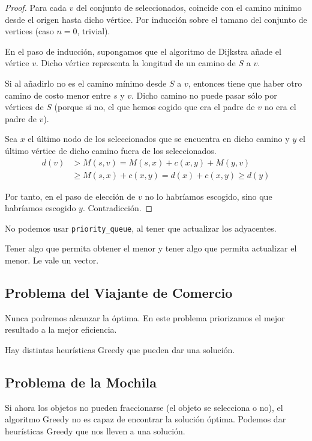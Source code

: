\begin{proof}
    Para cada $v$ del conjunto de seleccionados, coincide con el camino minimo desde el origen hasta dicho vértice. Por inducción sobre el tamano del conjunto de vertices (caso $n=0$, trivial).

    En el paso de inducción, supongamos que el algoritmo de Dijkstra añade el vértice $v$. Dicho vértice representa la longitud de un camino de $S$ a $v$.

    Si al añadirlo no es el camino mínimo desde $S$ a $v$, entonces tiene que haber otro camino de costo menor entre $s$ y $v$. Dicho camino no puede pasar sólo por vértices de $S$ (porque si no, el que hemos cogido que era el padre de $v$ no era el padre de $v$).

    Sea $x$ el último nodo de los seleccionados que se encuentra en dicho camino y $y$ el último vértice de dicho camino fuera de los seleccionados.
    \begin{align*}
        d(v) &> M(s,v) = M(s,x) + c(x,y) + M(y, v)\\
             &\geq M(s,x) + c(x,y) = d(x) + c(x,y) \geq d(y)
    \end{align*}

    Por tanto, en el paso de elección de $v$ no lo habríamos escogido, sino que habríamos escogido $y$. Contradicción.
\end{proof}

\begin{Observacion}
    No podemos usar \verb|priority_queue|, al tener que actualizar los adyacentes.

    Tener algo que permita obtener el menor y tener algo que permita actualizar el menor.
    Le vale un vector.
\end{Observacion}

\subsection{Problema del Viajante de Comercio}
Nunca podremos alcanzar la óptima. En este problema priorizamos el mejor resultado a la mejor eficiencia.

Hay distintas heurísticas Greedy que pueden dar una solución.

\subsection{Problema de la Mochila}
Si ahora los objetos no pueden fraccionarse (el objeto se selecciona o no), el algoritmo Greedy no es capaz de encontrar la solución óptima. Podemos dar heurísticas Greedy que nos lleven a una solución.
